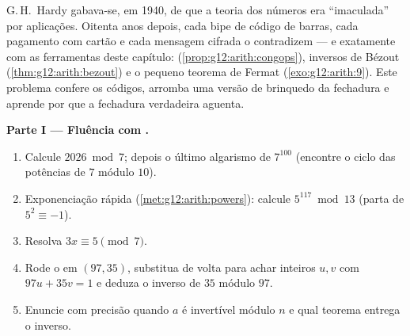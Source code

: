 \begin{problem}
\label{pb:g12:arith:1}
G.\,H.~Hardy gabava-se, em 1940, de que a teoria dos números era
``imaculada'' por aplicações. Oitenta anos depois, cada bipe de
código de barras, cada pagamento com cartão e cada mensagem
cifrada o contradizem --- e exatamente com as ferramentas deste
capítulo:  (\cref{prop:g12:arith:congops}), inversos de
Bézout (\cref{thm:g12:arith:bezout}) e o pequeno teorema de Fermat
(\cref{exo:g12:arith:9}). Este problema confere os códigos, arromba
uma versão de brinquedo da fechadura e aprende por que a fechadura
verdadeira aguenta.

\medskip
\noindent\textbf{Parte I --- Fluência com .}
\begin{enumerate}
  \item Calcule $2026 \bmod 7$; depois o último algarismo de
        $7^{100}$ (encontre o ciclo das potências de $7$ módulo
        $10$).
  \item Exponenciação rápida (\cref{met:g12:arith:powers}):
        calcule $5^{117} \bmod 13$ (parta de
        $5^2 \equiv -1$).
  \item Resolva $3x \equiv 5 \pmod 7$.
  \item Rode o  em $(97, 35)$, substitua de
        volta para achar inteiros $u, v$ com $97u + 35v = 1$ e
        deduza o inverso de $35$ módulo $97$.
  \item Enuncie com precisão quando $a$ é invertível módulo $n$ e
        qual teorema entrega o inverso.
\end{enumerate}


\end{problem}
